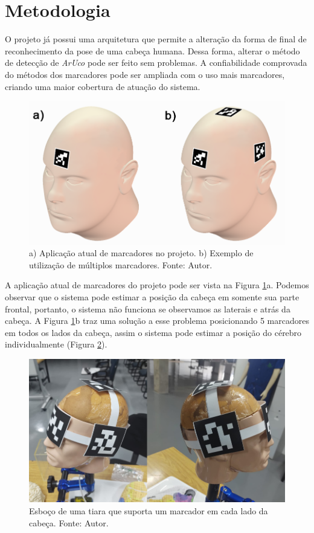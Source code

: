 \section{Metodologia}

O projeto já possui uma arquitetura que permite a alteração da forma de final de reconhecimento da pose de uma cabeça humana. Dessa forma, alterar o método de detecção de \textit{ArUco} pode ser feito sem problemas. A confiabilidade comprovada do métodos dos marcadores pode ser ampliada com o uso mais marcadores, criando uma maior cobertura de atuação do sistema.

\begin{figure}[ht]
    \centering
    \includegraphics[width=.6\linewidth]{figuras/head_marker.png}
    \caption{a) Aplicação atual de marcadores no projeto. b) Exemplo de utilização de múltiplos marcadores. Fonte: Autor.}
    \label{fig:head-markers}
\end{figure}

A aplicação atual de marcadores do projeto pode ser vista na Figura \ref{fig:head-markers}a. Podemos observar que o sistema pode estimar a posição da cabeça em somente sua parte frontal, portanto, o sistema não funciona se observamos as laterais e atrás da cabeça. A Figura \ref{fig:head-markers}b traz uma solução a esse problema posicionando 5 marcadores em todos os lados da cabeça, assim o sistema pode estimar a posição do cérebro individualmente (Figura \ref{fig:tiara}).

\begin{figure}[ht]
    \centering
    \includegraphics[width=.6\linewidth]{figuras/tiara.png}
    \caption{Esboço de uma tiara que suporta um marcador em cada lado da cabeça. Fonte: Autor.}
    \label{fig:tiara}
\end{figure}


